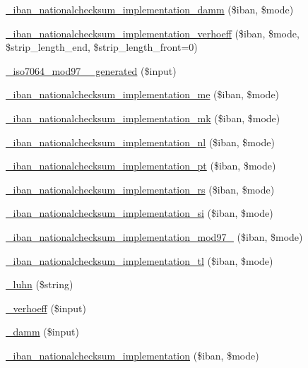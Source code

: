 \begin{DoxyCompactItemize}
\item 
\hyperlink{classWEPPO_1_1Helpers_1_1IBAN_a38c72ba90871404ba4aa00336dab0f63}{\+\_\+iban\+\_\+nationalchecksum\+\_\+implementation\+\_\+damm} (\$iban, \$mode)
\item 
\hyperlink{classWEPPO_1_1Helpers_1_1IBAN_ab2abe92aee5220fdce91999a9b5738b3}{\+\_\+iban\+\_\+nationalchecksum\+\_\+implementation\+\_\+verhoeff} (\$iban, \$mode, \$strip\+\_\+length\+\_\+end, \$strip\+\_\+length\+\_\+front=0)
\item 
\hyperlink{classWEPPO_1_1Helpers_1_1IBAN_a7c5df4687f30598d8305c12d72c64bb7}{\+\_\+iso7064\+\_\+mod97\+\_\+\_\+generated} (\$input)
\item 
\hyperlink{classWEPPO_1_1Helpers_1_1IBAN_a8a4c22be449cd9ad4682fbbd679f9485}{\+\_\+iban\+\_\+nationalchecksum\+\_\+implementation\+\_\+me} (\$iban, \$mode)
\item 
\hyperlink{classWEPPO_1_1Helpers_1_1IBAN_aad508d3268f6ab57621d5fc23e4b8bd8}{\+\_\+iban\+\_\+nationalchecksum\+\_\+implementation\+\_\+mk} (\$iban, \$mode)
\item 
\hyperlink{classWEPPO_1_1Helpers_1_1IBAN_a4848c7e1800c1c14abd6d7412ce28669}{\+\_\+iban\+\_\+nationalchecksum\+\_\+implementation\+\_\+nl} (\$iban, \$mode)
\item 
\hyperlink{classWEPPO_1_1Helpers_1_1IBAN_a54567e7cf4efc222c803f48f65b64d6e}{\+\_\+iban\+\_\+nationalchecksum\+\_\+implementation\+\_\+pt} (\$iban, \$mode)
\item 
\hyperlink{classWEPPO_1_1Helpers_1_1IBAN_ab1af339f58e5e5502e12fce3e88ea48e}{\+\_\+iban\+\_\+nationalchecksum\+\_\+implementation\+\_\+rs} (\$iban, \$mode)
\item 
\hyperlink{classWEPPO_1_1Helpers_1_1IBAN_a436dd33ad4abfe116c6049a1e1ba1c2e}{\+\_\+iban\+\_\+nationalchecksum\+\_\+implementation\+\_\+si} (\$iban, \$mode)
\item 
\hyperlink{classWEPPO_1_1Helpers_1_1IBAN_aaee2618c3b6fb991db4a2b1aef3bd8a2}{\+\_\+iban\+\_\+nationalchecksum\+\_\+implementation\+\_\+mod97\+\_} (\$iban, \$mode)
\item 
\hyperlink{classWEPPO_1_1Helpers_1_1IBAN_a2c262224fde45c77716f7625d8f07a94}{\+\_\+iban\+\_\+nationalchecksum\+\_\+implementation\+\_\+tl} (\$iban, \$mode)
\item 
\hyperlink{classWEPPO_1_1Helpers_1_1IBAN_a5c010ba898e36f6fcbb289305d22815c}{\+\_\+luhn} (\$string)
\item 
\hyperlink{classWEPPO_1_1Helpers_1_1IBAN_af53c2faae776176f15255427bd31f730}{\+\_\+verhoeff} (\$input)
\item 
\hyperlink{classWEPPO_1_1Helpers_1_1IBAN_a26e276e77d034b5d0620b43ed696fbf3}{\+\_\+damm} (\$input)
\item 
\hyperlink{classWEPPO_1_1Helpers_1_1IBAN_a29cdbabcc1a8b98beaaa6e1f2c555599}{\+\_\+iban\+\_\+nationalchecksum\+\_\+implementation} (\$iban, \$mode)
\end{DoxyCompactItemize}
